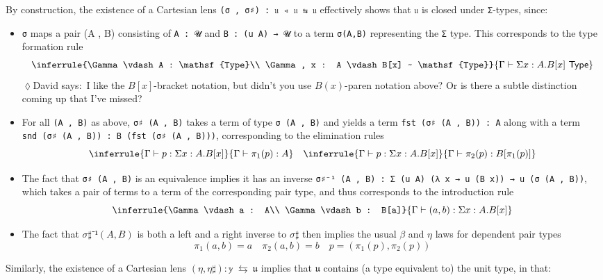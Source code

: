 \documentclass[
  11pt,
  oneside,
  article]{memoir}
\providecommand{\tightlist}{%
  \setlength{\itemsep}{0pt}\setlength{\parskip}{0pt}}
\theoremstyle{definition}
\theoremstyle{plain}
\newcommand{\0}{\textsf{0}}
\newcommand{\1}{\tn{\textsf{1}}}
\newcommand{\dnote}[1]{{\quad \color{blue}$\lozenge$\;David says:}~#1\;{\color{blue}$\lozenge$}\quad}
\begin{document}
By construction, the existence of a Cartesian lens
\texttt{(σ\ ,\ σ♯)\ :\ 𝔲\ ◃\ 𝔲\ ⇆\ 𝔲} effectively shows that \texttt{𝔲}
is closed under \texttt{Σ}-types, since:

\begin{itemize}
\tightlist
\item
  \texttt{σ} maps a pair (A , B) consisting of \texttt{A\ :\ 𝓤} and
  \texttt{B\ :\ (u\ A)\ →\ 𝓤} to a term \texttt{σ(A,B)} representing the
  \texttt{Σ} type. This corresponds to the type formation rule
  \[ \inferrule{\Gamma \vdash A : \mathsf{Type}\\ \Gamma, x : A \vdash B[x] ~ \mathsf{Type}}{\Gamma \vdash \Sigma x : A . B[x] ~ \mathsf{Type}} \]\dnote{I like the $B[x]$-bracket notation, but didn't you use $B(x)$-paren notation above? Or is there a subtle distinction coming up that I've missed?}
\item
  For all \texttt{(A\ ,\ B)} as above, \texttt{σ♯\ (A\ ,\ B)} takes a
  term of type \texttt{σ\ (A\ ,\ B)} and yields a term
  \texttt{fst\ (σ♯\ (A\ ,\ B))\ :\ A} along with a term
  \texttt{snd\ (σ♯\ (A\ ,\ B))\ :\ B\ (fst\ (σ♯\ (A\ ,\ B)))},
  corresponding to the elimination rules \[
  \inferrule{\Gamma \vdash p : \Sigma x : A . B[x]}{\Gamma \vdash \pi_1(p) : A} \quad \inferrule{\Gamma \vdash p : \Sigma x : A . B[x]}{\Gamma \vdash \pi_2(p) : B[\pi_1(p)]} \]
\item
  The fact that \texttt{σ♯\ (A\ ,\ B)} is an equivalence implies it
  has an inverse
  \texttt{σ♯⁻¹\ (A\ ,\ B)\ :\ Σ\ (u\ A)\ (λ\ x\ →\ u\ (B\ x))\ →\ u\ (σ\ (A\ ,\ B))},
  which takes a pair of terms to a term of the corresponding pair type,
  and thus corresponds to the introduction rule
  \[ \inferrule{\Gamma \vdash a : A\\ \Gamma \vdash b : B[a]}{\Gamma \vdash (a , b) : \Sigma x : A . B[x]} \]
\item
  The fact that \(σ♯⁻¹ (A , B)\) is both a left and a right inverse to
  \(σ♯\) then implies the usual \(β\) and \(η\) laws for dependent pair
  types
  \[ \pi_1(a , b) = a \quad \pi_2(a , b) = b \quad p = (\pi_1(p) , \pi_2(p)) \]
\end{itemize}

Similarly, the existence of a Cartesian lens \((η , η♯) : 𝕪\ ⇆\ 𝔲\)
implies that \(𝔲\) contains (a type equivalent to) the unit type, in
that:
\end{document}
